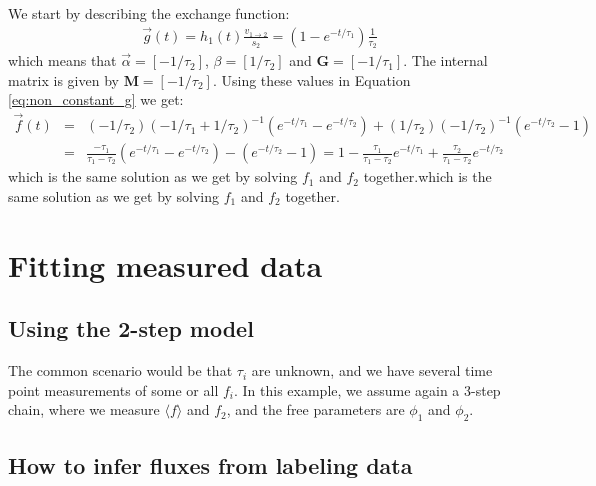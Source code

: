 \documentclass{article}
\newcommand{\fin}{\ensuremath{\langle f \rangle}}
\begin{document}
We start by describing the exchange function:
\begin{eqnarray}
    \vec{g}(t) = h_1(t) \frac{v_{1 \rightarrow 2}}{s_2} = (1 - e^{-t/\tau_1}) \frac{1}{\tau_2}
\end{eqnarray}
which means that $\vec{\alpha} = [-1/\tau_2]$, $\beta = [1/\tau_2]$ and $\mathbf{G} = [-1/\tau_1]$. The internal matrix is given by $\mathbf{M} = [-1/\tau_2]$. Using these values in Equation \ref{eq:non_constant_g} we get:
\begin{eqnarray}
    \vec{f}(t) &=& (-1/\tau_2) (-1/\tau_1 + 1/\tau_2)^{-1} (e^{-t/\tau_1} - e^{-t/\tau_2}) + (1/\tau_2) (-1/\tau_2)^{-1} (e^{-t/\tau_2} - 1) \nonumber\\
    &=& \frac{-\tau_1}{\tau_1 - \tau_2} (e^{-t/\tau_1} - e^{-t/\tau_2}) - (e^{-t/\tau_2} - 1)
    = 1 - \frac{\tau_1}{\tau_1 - \tau_2} e^{-t/\tau_1} + \frac{\tau_2}{\tau_1 - \tau_2} e^{-t/\tau_2}
\end{eqnarray}
which is the same solution as we get by solving $f_1$ and $f_2$ together.which is the same solution as we get by solving $f_1$ and $f_2$ together.


\clearpage
\section{Fitting measured data}

\subsection{Using the 2-step model}
The common scenario would be that $\tau_i$ are unknown, and we have several time point measurements of some or all $f_i$. In this example, we assume again a 3-step chain, where we measure $\fin$ and $f_2$, and the free parameters are $\phi_1$ and $\phi_2$. 

\subsection{How to infer fluxes from labeling data}
\end{document}
